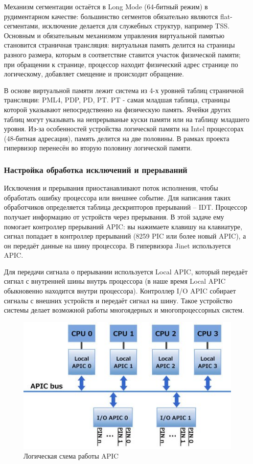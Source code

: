 \documentclass[a4paper,12pt]{extarticle}
\begin{document}
	Механизм сегментации остаётся в Long Mode (64-битный режим) в рудиментарном качестве: большинство сегментов обязательно являются flat-сегментами, исключение делается для служебных структур, например TSS. Основным и обязательным механизмом управления виртуальной памятью становится страничная трансляция: виртуальная память делится на страницы разного размера, которым в соответствие ставится участок физической памяти; при обращении к странице, процессор находит физический адрес странице по логическому, добавляет смещение и происходит обращение.\par
	В основе виртуальной памяти лежит система из 4-х уровней таблиц страничной трансляции: PML4, PDP, PD, PT. PT - самая младшая таблица, страницы которой указывают непосредственно на физическую память. Ячейки других таблиц могут указывать на непрерываные куски памяти или на таблицу младшего уровня. Из-за особенностей устройства логической памяти на Intel процессорах (48-битная адресация), память делится на две половины. В рамках проекта гипервизор перенесён во вторую половину логической памяти.
	
	\subsubsection{Настройка обработка исключений и прерываний}
	Исключения и прерывания приостанавливают поток исполнения, чтобы обработать ошибку процессора или внешнее событие. Для написания таких обработчиков определяется таблица дескрипторов прерываний – IDT. Процессор получает информацию от устройств через прерывания. В этой задаче ему помогает контроллер прерываний APIC: вы нажимаете клавишу на клавиатуре, сигнал попадает в контроллер прерываний (8259 PIC или более новый APIC), а он передаёт данные на шину процессора. В гипервизора Jinet используется APIC.\par
	Для передачи сигнала о прерывании используется Local APIC, который передаёт сигнал с внутренней шины внутрь процессора (в наше время Local APIC обыкновенно находится внутри процессора). Контроллер I/O APIC собирает сигналы с внешних устройств и передаёт сигнал на шину. Такое устройство системы делает возможной работы многоядерных и многопроцессорных систем.
	\begin{figure}[htb]
		\centering
		\includegraphics[width=0.7\linewidth]{../diagrams/ioapic}
		\caption{Логическая схема работы APIC}
		\label{fig:ioapic}
	\end{figure}
	
\end{document}
